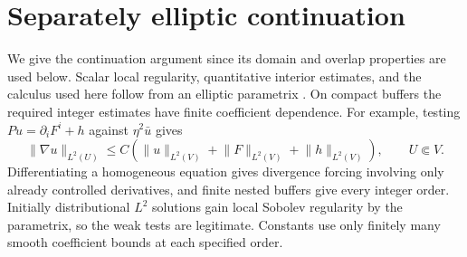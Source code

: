 \documentclass[11pt]{article}
\theoremstyle{definition}\newtheorem{definition}[theorem]{Definition}
\theoremstyle{remark}\newtheorem{remark}[theorem]{Remark}
\newcommand{\norm}[1]{\lVert #1\rVert}
\begin{document}
\section{Separately elliptic continuation}\label{sec:cross}

We give the continuation argument since its domain and overlap properties
are used below. Scalar local regularity, quantitative interior estimates,
and the calculus used here follow from an elliptic parametrix
\cite[Lecture I, Sections 3--4]{Taylor}. On compact buffers the required
integer estimates have finite coefficient dependence. For example, testing
$Pu=\partial_iF^i+h$ against $\eta^2\bar u$ gives
\[
 \norm{\nabla u}_{L^2(U)}\le
 C(\norm{u}_{L^2(V)}+\norm{F}_{L^2(V)}+\norm{h}_{L^2(V)}),\qquad U\Subset V.
\]
Differentiating a homogeneous equation gives divergence forcing involving
only already controlled derivatives, and finite nested buffers give every
integer order. Initially distributional $L^2$ solutions gain local Sobolev
regularity by the parametrix, so the weak tests are legitimate. Constants
use only finitely many smooth coefficient bounds at each specified order.
\end{document}
